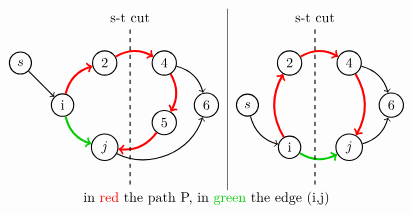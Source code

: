 \[\begin{tabular}{c|c}
    \begin{tikzpicture}[node distance={15mm}, thick , main/.style = {draw, circle}] 
    
    \node[main] (1) {i};
    \node[main] (0) [above left of = 1] {$s$};
    \node[main] (2) [above right of=1] {$2$};
    \node[main] (3) [below right of=1] {$j$};
    \node[main] (4) [right of=2] {$4$};
    \node[main] (6) [below right of=4] {$6$};
    \node[main] (5) [below of=4] {$5$};
    \draw[->] (0) to (1);
    \draw[->,line width=1.5 pt] (1)[red, bend left] to (2);
    \draw[->,line width=1.5 pt] (1)[green!80!black, bend right] to (3);
    \draw[->,line width=1.5 pt] (2)[red, bend left] to (4);
    \draw[->,line width=1.5 pt] (4)[red,bend left] to (5);
    \draw[->] (4)[bend left] to (6);
    \draw[->] (3)[bend right = 50] to (6);
    \draw[->,line width=1.5 pt] (5)[red,bend left] to (3);

    \draw[dashed] (1.7,-2) -- (1.7,2);
    \node at (1.7,2.2) {s-t\ cut};

\end{tikzpicture}& 
\begin{tikzpicture}[node distance={15mm}, thick , main/.style = {draw, circle}] 
    
    
    \node[main] (0) {$s$};
    \node[main] (1) [below right of = 0] {i};
    \node[main] (2) [above right of=0] {$2$};
    \node[main] (4) [right of=2] {$4$};
    \node[main] (6) [below right of=4] {$6$};
    \node[main] (3) [below left of=6] {$j$};
    \draw[->] (0)[bend right] to (1);
    \draw[->,line width=1.5 pt] (1)[red, bend left] to (2);
    \draw[->,line width=1.5 pt] (1)[green!80!black, bend right] to (3);
    \draw[->,line width=1.5 pt] (2)[red, bend left] to (4);
    \draw[->,line width=1.5 pt] (4)[red, bend left] to (3);
    
    \draw[->] (4)[bend left] to (6);
    \draw[->] (3)[bend right] to (6);


    \draw[dashed] (1.7,-2) -- (1.7,2);
    \node at (1.7,2.2) {s-t\ cut};

\end{tikzpicture}\\
    \multicolumn{2}{c}{in {\color{red}{red}} the path P, in {\color{green!80!black}{green}} the edge (i,j)}

\end{tabular}\]

